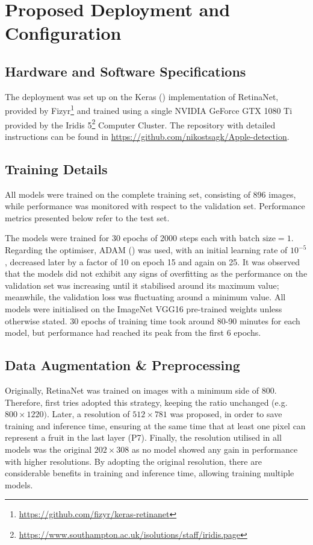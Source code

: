 \section{Proposed Deployment and Configuration}
\subsection{Hardware and Software Specifications}
The deployment was set up on the Keras (\cite{chollet2015keras}) implementation of RetinaNet, provided by Fizyr\footnote{\url{https://github.com/fizyr/keras-retinanet}} and trained using a single NVIDIA GeForce GTX 1080 Ti provided by the Iridis 5\footnote{\url{https://www.southampton.ac.uk/isolutions/staff/iridis.page}} Computer Cluster. The repository with detailed instructions can be found in \url{https://github.com/nikostsagk/Apple-detection}.

\subsection{Training Details}\label{training_details}
All models were trained on the complete training set, consisting of 896 images, while performance was monitored with respect to the validation set. Performance metrics presented below refer to the test set.

The models were trained for 30 epochs of 2000 steps each with $\text{batch size} = 1$. Regarding the optimiser, ADAM (\cite{kingma2014adam}) was used, with an initial learning rate of $10^{-5}$, decreased later by a factor of 10 on epoch 15 and again on 25. It was observed that the models did not exhibit any signs of overfitting as the performance on the validation set was increasing until it stabilised around its maximum value; meanwhile, the validation loss was fluctuating around a minimum value. All models were initialised on the ImageNet VGG16 pre-trained weights unless otherwise stated. 30 epochs of training time took around 80-90 minutes for each model, but performance had reached its peak from the first 6 epochs.

\subsection{Data Augmentation \& Preprocessing}
Originally, RetinaNet was trained on images with a minimum side of 800. Therefore, first tries adopted this strategy, keeping the ratio unchanged (e.g. $800\times1220)$. Later, a resolution of $512\times781$ was proposed, in order to save training and inference time, ensuring at the same time that at least one pixel can represent a fruit in the last layer (P7). Finally, the resolution utilised in all models was the original $202\times308$ as no model showed any gain in performance with higher resolutions. By adopting the original resolution, there are considerable benefits in training and inference time, allowing training multiple models.

